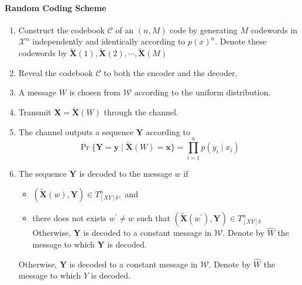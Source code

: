 \documentclass[8pt]{article}
\begin{document}
\paragraph{Random Coding Scheme}
\begin{enumerate}
	\item Construct the codebook $\mathcal{C}$ of an $(n, M)$ code by generating $M$ codewords in $\mathcal{X}^{n}$ independently and identically according to $p(x)^{n} .$ Denote these codewords by $\tilde{\mathbf{X}}(1), \tilde{\mathbf{X}}(2), \cdots, \tilde{\mathbf{X}}(M)$
	\item Reveal the codebook $\mathcal{C}$ to both the encoder and the decoder.
	\item A message $W$ is chosen from $\mathcal{W}$ according to the uniform distribution.
	\item Transmit $\mathbf{X}=\tilde{\mathbf{X}}(W)$ through the channel.
	\item The channel outputs a sequence $\mathbf{Y}$ according to
	$$
	\operatorname{Pr}\{\mathbf{Y}=\mathbf{y} \mid \tilde{\mathbf{X}}(W)=\mathbf{x}\}=\prod_{i=1}^{n} p\left(y_{i} \mid x_{i}\right)
	$$
	\item The sequence $\mathbf{Y}$ is decoded to the message $w$ if
	\begin{itemize}
		\item $(\tilde{\mathbf{X}}(w), \mathbf{Y}) \in T_{[X Y] \delta}^{n},$ and
		\item there does not exists $w^{\prime} \neq w$ such that $\left(\tilde{\mathbf{X}}\left(w^{\prime}\right), \mathbf{Y}\right) \in T_{[X Y] \delta}^{n}$
		Otherwise, $\mathbf{Y}$ is decoded to a constant message in $\mathcal{W}$. Denote by $\hat{W}$ the message to which $\mathbf{Y}$ is decoded.
	\end{itemize}
	Otherwise, $\mathbf{Y}$ is decoded to a constant message in $\mathcal{W}$. Denote by $\hat{W}$ the message to which $Y$ is decoded.
\end{enumerate}
\end{document}
